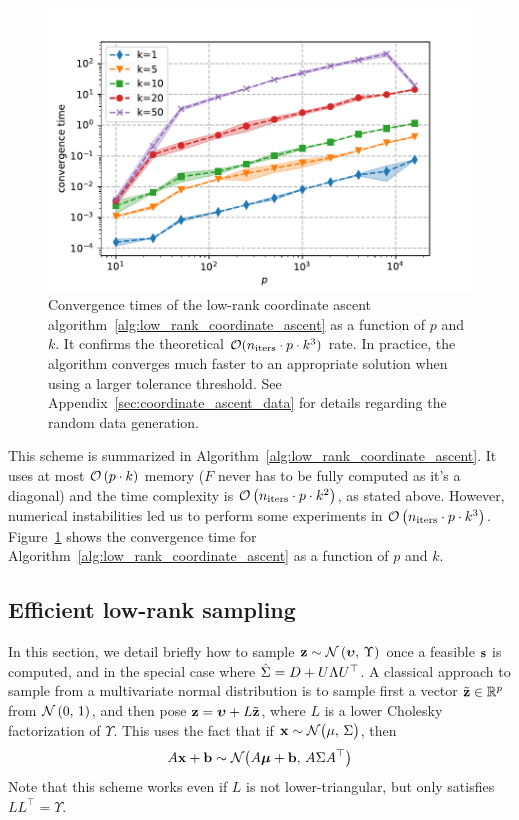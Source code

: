 \begin{figure}
    \centering
    \includegraphics[width=0.8\linewidth, height=0.5\linewidth]{figures/low_rank_times.pdf}
    \caption{
        Convergence times of the low-rank coordinate ascent algorithm~\ref{alg:low_rank_coordinate_ascent}
        as a function of $p$ and $k$.
        It confirms the theoretical $\mathcal{O}(n_{\text{iters}} \cdot p \cdot k^3)$ rate.
        In practice,
        the algorithm converges much faster to an appropriate solution when using a larger tolerance threshold.
        See Appendix~\ref{sec:coordinate_ascent_data} for details regarding the random data generation.
    }
    \label{fig:low_rank_times}
\end{figure}

This scheme is summarized in Algorithm~\ref{alg:low_rank_coordinate_ascent}.
It uses at most $\mathcal{O}\left( p \cdot k \right)$ memory ($F$ never has to be fully computed as it's a diagonal)
and the time complexity is $\mathcal{O}\left( n_\text{iters} \cdot p \cdot k^2 \right)$, as stated above.
However, numerical instabilities led us to perform some experiments in $\mathcal{O}\left( n_\text{iters} \cdot p \cdot k^3 \right)$.
Figure~\ref{fig:low_rank_times} shows the convergence time for Algorithm~\ref{alg:low_rank_coordinate_ascent} as
a function of $p$ and $k$.

\subsection{Efficient low-rank sampling}\label{subsec:low_rank_sampling}

In this section, we detail briefly how to sample $\mathbf{z} \sim \mathcal{N}\left( \bm{\upsilon},\, \Upsilon \right)$ once
a feasible $\mathbf{s}$ is computed, and in the special case where $\hat{\Sigma} = D + U\Lambda U^\top$.
A classical approach to sample from a multivariate normal distribution is to sample first a vector
$\tilde{\mathbf{z}} \in \mathbb{R}^p$ from $\mathcal{N}\left( 0,\, 1 \right)$,
and then pose $\mathbf{z} = \bm{\upsilon} + L\tilde{\mathbf{z}}$,
where $L$ is a lower Cholesky factorization of $\Upsilon$.
This uses the fact that if $\mathbf{x} \sim \mathcal{N}\big( \mu,\, \Sigma \big)$,
then
\begin{equation}\label{eq:affine_transformation}
    A\mathbf{x} + \mathbf{b} \sim \mathcal{N}\big( A\bm{\mu} + \mathbf{b},\, A\Sigma A^\top \big)
\end{equation}
Note that this scheme works even if $L$ is not lower-triangular,
but only satisfies $LL^\top = \Upsilon$.

